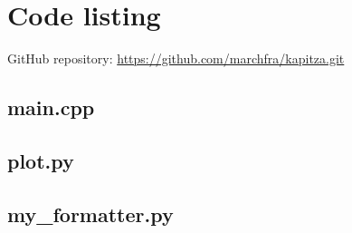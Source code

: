 \section{Code listing}

GitHub repository: \href{https://github.com/marchfra/kapitza.git}{https://github.com/marchfra/kapitza.git}

\subsection{main.cpp}


\subsection{plot.py}


\subsection{my\_formatter.py}
